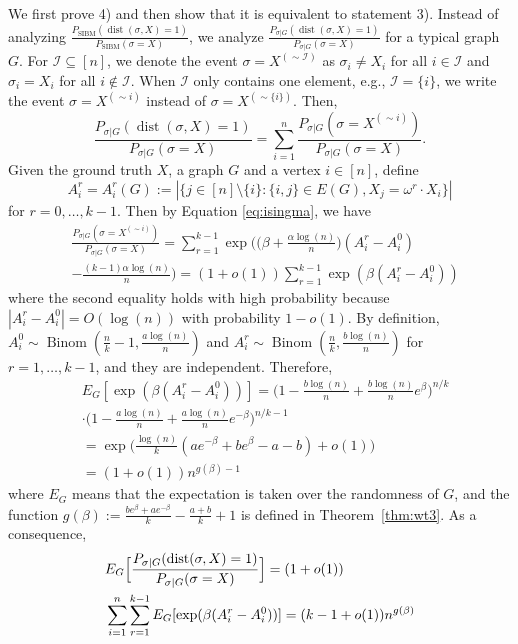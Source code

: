 \label{key}\documentclass[conference]{IEEEtran}
\DeclareMathOperator{\SIBM}{SIBM}
\newcommand{\cI}{\mathcal{I}}
\DeclareMathOperator{\dist}{dist}
\DeclareMathOperator{\Binom}{Binom}
\begin{document}
We first prove 4) and then show that it is equivalent to statement 3).
Instead of analyzing $\frac{P_{\SIBM} ( \dist(\sigma, X) = 1 )}{P_{\SIBM}(\sigma= X)}$, we analyze $\frac{P_{\sigma|G} ( \dist(\sigma, X) = 1 )}{P_{\sigma|G}(\sigma= X)}$ for a typical graph $G$.
For $\cI \subseteq [n]$, we denote the event $\sigma = X^{(\sim \cI)}$ as $\sigma_i \neq X_i$ for all $i \in \cI$ and $\sigma_i = X_i$ for all $i \not\in \cI$.
When $\cI$ only contains one element, e.g., $\cI=\{i\}$, we write the event $\sigma = X^{(\sim i)}$ instead of $\sigma = X^{(\sim\{i\})}$.
Then,
$$
\frac{P_{\sigma|G} ( \dist(\sigma, X) = 1 )}{P_{\sigma|G}(\sigma= X)}
=\sum_{i=1}^n \frac{P_{\sigma|G} ( \sigma= X^{(\sim i)} )} {P_{\sigma|G}(\sigma= X)} .
$$
Given the ground truth $X$, a graph $G$ and a vertex $i\in[n]$, define
\begin{equation*}
A^r_i=A^r_i(G):=|\{j\in[n]\setminus\{i\}:\{i,j\}\in E(G), X_j=\omega^r \cdot X_i\} |
\end{equation*}
for $ r=0, \dots, k-1$.
Then by Equation \eqref{eq:isingma}, we have
\begin{align}
&\frac{P_{\sigma|G}(\sigma=X^{(\sim i)} )}
{P_{\sigma|G}(\sigma=X)}
 = \sum_{r=1}^{k-1}\exp\Big(\big(\beta+\frac{\alpha\log(n)}{n} \big) (A^r_i-A^0_i) \nonumber\\
&-\frac{(k-1)\alpha\log(n)}{n} \Big) 
 = (1+o(1)) \sum_{r=1}^{k-1}\exp ( \beta(A^r_i-A^0_i)) \label{eq:kbetaA}
\end{align}
where the second equality holds with high probability because $|A^r_i-A^0_i|=O(\log(n))$ with probability $1-o(1)$.
By definition,
$A^0_i\sim \Binom(\frac{n}{k}-1,\frac{a\log(n)}{n})$ and $A^r_i\sim \Binom(\frac{n}{k}, \frac{b\log(n)}{n})$ for $r=1,\dots, k-1$, and they are independent. Therefore,
\begin{align}
&E_G[\exp (\beta (A^r_i-A^0_i))]
 =\Big(1-\frac{b\log(n)}{n}+\frac{b\log(n)}{n} e^{\beta} \Big)^{n/k} \nonumber \\
&\cdot \Big(1-\frac{a\log(n)}{n}+\frac{a\log(n)}{n} e^{-\beta} \Big)^{n/k-1}\nonumber\\
& = 
\exp\Big(\frac{\log(n)}{k} ( a e^{-\beta}+b e^{\beta} -a-b )
+o(1) \Big)\nonumber \\
& = (1+o(1)) n^{g(\beta)-1} \label{eq:gbetaminus1}
\end{align}
where $E_G$ means that the expectation is taken over the randomness of $G$, and the function
$g(\beta)  := \frac{b e^{\beta}+a e^{-\beta}}{k}-\frac{a+b}{k}+1$ is defined in Theorem~\ref{thm:wt3}.
As a consequence,
\begin{align} \label{eq:mew}
&E_G \Big[ \frac{P_{\sigma|G} ( \dist(\sigma, X) = 1 )}{P_{\sigma|G}(\sigma= X)} \Big]
= (1+o(1)) \notag\\
&\sum_{i=1}^n\sum_{r=1}^{k-1} E_G[\exp ( \beta (A^r_i-A^0_i))]
= (k-1+o(1)) n^{g(\beta)} 
\end{align}
\end{document}
